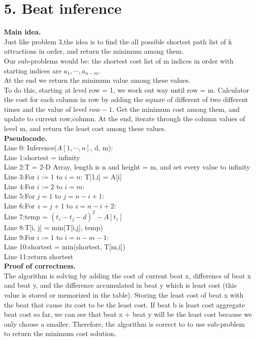 \documentclass[11pt]{article}
\newcommand{\tab}{\hspace*{2em}}
\begin{document}
\newpage
\section*{5. Beat inference}
\noindent
\textbf{Main idea.}\\
Just like problem 3,the idea is to find the all possible shortest path list of k attractions in order, and return the minimum among them. \\
Our sub-problems would be: the shortest cost list of m indices in order with starting indices are $a_1, \cdots, a_{n - m}$.\\
At the end we return the minimum value among these values.\\
To do this, starting at level row = 1, we work out way until row = m. Calculator the cost for each column in row by adding the square of different of two different times and the value of level $row - 1$. Get the minimum cost among them, and update to current row,column. At the end, iterate through the column values of level m, and return the least cost among these values.
\\
\noindent
\textbf{Pseudocode.}\\
Line 0: Inference($A[1,\cdots, n]$, d, m):\\
Line 1:\tab shortest = infinity\\
Line 2:\tab T = 2-D Array, length is n and height = m, and set every value to infinity\\ 
Line 3:\tab For $i:= 1$ to $i = n$: T[1,i] = A[i]\\ 
Line 4:\tab For $i:= 2$ to $i = m$:\\
Line 5:\tab\tab For $j = 1$ to $j = n - i + 1$:\\
Line 6:\tab\tab\tab For $z = j + 1$ to $z = n - i + 2$:\\
Line 7:\tab\tab\tab\tab temp = $(t_z - t_j - d)^2 - A[t_z]$\\
Line 8:\tab\tab\tab\tab T[i, j] = min(T[i,j], temp)\\
Line 9:\tab For $i:= 1$ to $i = n - m - 1$:\\
Line 10:\tab\tab shortest = min(shortest, T[m,i])\\
Line 11:\tab return shortest\\

\noindent
\textbf{Proof of correctness.}\\
The algorithm is solving by adding the cost of current beat x, difference of beat x and beat y, and the difference accumulated in beat y which is least cost (this value is stored or memorized in the table). Storing the least cost of beat x with the beat that cause its cost to be the least cost. If beat b is least cost aggregate beat cost so far, we can see that beat x + beat y will be the least cost because we only choose a smaller. Therefore, the algorithm is correct to to use sub-problem to return the minimum cost solution.
\end{document}
